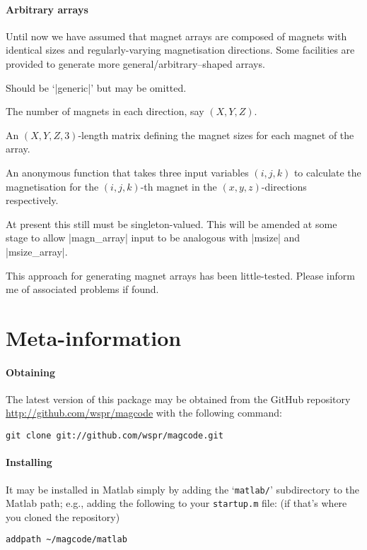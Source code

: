\documentclass{article}
\begin{document}
\paragraph{Arbitrary arrays}
Until now we have assumed that magnet arrays are composed of magnets with identical sizes and regularly-varying magnetisation directions.
Some facilities are provided to generate more general/arbitrary--shaped arrays.
\begin{description}[noitemsep,font=\ttfamily]
\item[array.type] Should be `|generic|' but may be omitted.
\item[array.mcount] The number of magnets in each direction, say $(X,Y,Z)$.
\item[array.msize_array] An $(X,Y,Z,3)$-length matrix defining the magnet sizes for each magnet of the array.
\item[array.magdir_fn] An anonymous function that takes three input variables $(i,j,k)$ to calculate the magnetisation for the $(i,j,k)$-th magnet in the $(x,y,z)$-directions respectively.
\item[array.magn] At present this still must be singleton-valued. This will be amended at some stage to allow |magn_array| input to be analogous with |msize| and |msize_array|.
\end{description}
This approach for generating magnet arrays has been little-tested. Please inform me of associated problems if found.

\section{Meta-information}\label{meta}

\paragraph{Obtaining}
The latest version of this package may be obtained from the GitHub repository
\url{http://github.com/wspr/magcode} with the following command:
\begin{verbatim}
git clone git://github.com/wspr/magcode.git
\end{verbatim}

\paragraph{Installing}
It may be installed in Matlab simply by adding the `\texttt{matlab/}' subdirectory to the Matlab path; e.g., adding the following to your \texttt{startup.m} file: (if that's where you cloned the repository)
\begin{verbatim}
addpath ~/magcode/matlab
\end{verbatim}
\end{document}
